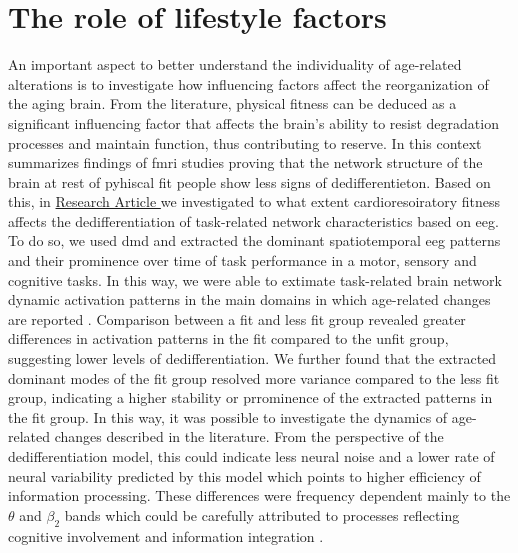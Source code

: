 \section{The role of lifestyle factors}
An important aspect to better understand the individuality of age-related alterations is to investigate how influencing factors affect the reorganization of the aging brain. From the literature, physical fitness can be deduced as a significant influencing factor that affects the brain's ability to resist degradation processes and maintain function, thus contributing to reserve. In this context \citeauthor{Stillman2019} \cite{Stillman2019} summarizes findings of \gls{fmri} studies proving that the network structure of the brain at rest of pyhiscal fit people show less signs of dedifferentieton. Based on this, in \hyperref[results:paperIII]{Research Article } we investigated to what extent cardioresoiratory fitness affects the dedifferentiation of task-related network characteristics based on \gls{eeg}. To do so, we used \gls{dmd} and extracted the dominant spatiotemporal \gls{eeg} patterns and their prominence over time of task performance in a motor, sensory and cognitive tasks. In this way, we were able to extimate task-related brain network dynamic activation patterns in the main domains in which age-related changes are reported \cite{Baltes1997, Sala-Llonch2015, Park2009}. Comparison between a fit and less fit group revealed greater differences in activation patterns in the fit compared to the unfit group, suggesting lower levels of dedifferentiation. We further found that the extracted dominant modes of the fit group resolved more variance compared to the less fit group, indicating a higher stability or prrominence of the extracted patterns in the fit group. In this way, it was possible to investigate the dynamics of age-related changes described in the literature. From the perspective of the dedifferentiation model, this could indicate less neural noise and a lower rate of neural variability predicted by this model which points to higher efficiency of information processing. These differences were frequency dependent mainly to the $\theta$ and $\beta_2$ bands which could be carefully attributed to processes reflecting cognitive involvement and information integration \cite{Siegel2012}.\\
